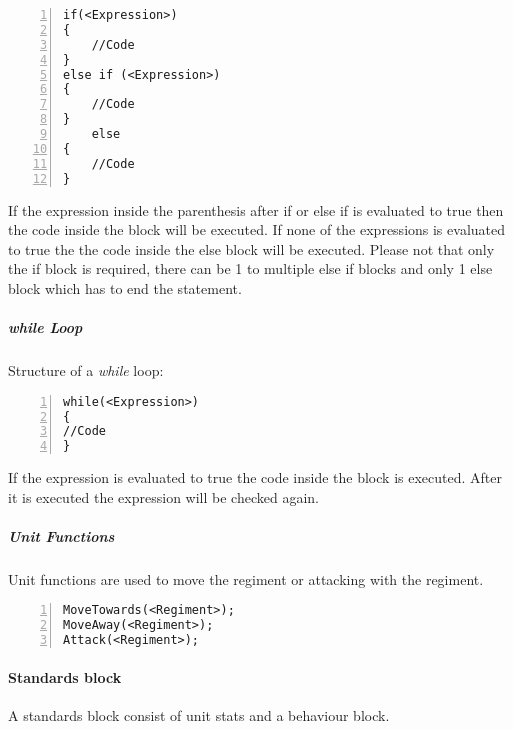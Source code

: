 		\begin{lstlisting}[basicstyle=\small\sffamily,
		keywordstyle={\color{blue}},
		comment={[l]{//}}, morecomment={[s]{/*}{*/}}, commentstyle=\itshape,
		columns={[l]flexible}, numbers=left, numberstyle=\tiny,
		frameround=fftt, frame=shadowbox, captionpos=b,
		caption={Regiment Assignment},
		label=RegimentAssignment]
if(<Expression>)
{
	//Code
}
else if (<Expression>)
{
	//Code
}
	else
{
	//Code
}
			\end{lstlisting}
			If the expression inside the parenthesis after if or else if is evaluated to true then the code inside the block will be executed.
			If none of the expressions is evaluated to true the the code inside the else block will be executed. Please not that only the if block
			is required, there can be 1 to multiple else if blocks and only 1 else block which has to end the statement. \\
		\subparagraph{while Loop}
			Structure of a {\it while} loop: \\			

		\begin{lstlisting}[basicstyle=\small\sffamily,
		keywordstyle={\color{blue}},
		comment={[l]{//}}, morecomment={[s]{/*}{*/}}, commentstyle=\itshape,
		columns={[l]flexible}, numbers=left, numberstyle=\tiny,
		frameround=fftt, frame=shadowbox, captionpos=b,
		caption={Regiment Assignment},
		label=RegimentAssignment]
while(<Expression>)
{
//Code
}
			\end{lstlisting}
			If the expression is evaluated to true the code inside the block is executed. After it is executed the expression will be checked again.
		\subparagraph{Unit Functions}
			Unit functions are used to move the regiment or attacking with the regiment.

		\begin{lstlisting}[basicstyle=\small\sffamily,
		keywordstyle={\color{blue}},
		comment={[l]{//}}, morecomment={[s]{/*}{*/}}, commentstyle=\itshape,
		columns={[l]flexible}, numbers=left, numberstyle=\tiny,
		frameround=fftt, frame=shadowbox, captionpos=b,
		caption={Regiment Assignment},
		label=RegimentAssignment]
MoveTowards(<Regiment>);
MoveAway(<Regiment>);
Attack(<Regiment>);
			\end{lstlisting}
	\paragraph{Standards block}
		A standards block consist of unit stats and a behaviour block. 

